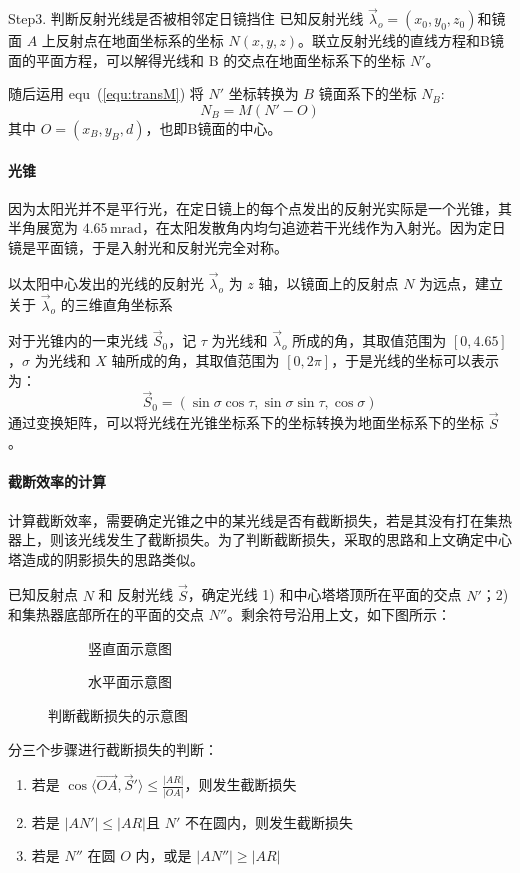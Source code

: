 \documentclass[../main.tex]{subfiles}
\begin{document}

Step3. 判断反射光线是否被相邻定日镜挡住
已知反射光线 \(\vec \lambda _{o} = (x_0,y_0,z_0)\)和镜面 \(A\) 上反射点在地面坐标系的坐标 \(N\)\((x, y, z)\)。联立反射光线的直线方程和B镜面的平面方程，可以解得光线和 B 的交点在地面坐标系下的坐标 \(N'\)。

随后运用 equ~(\ref{equ:transM}) 将 \(N'\) 坐标转换为 \(B\) 镜面系下的坐标 \(N_{B}\):
\[
N_{B} = M (N' - O)
\]
其中 \(O = (x_{B} , y_{B} , d)\)，也即B镜面的中心。

\paragraph{光锥}
因为太阳光并不是平行光，在定日镜上的每个点发出的反射光实际是一个光锥，其半角展宽为 \(4.65 \, \mathrm{m}\mathrm{rad}\)，在太阳发散角内均匀追迹若干光线作为入射光。因为定日镜是平面镜，于是入射光和反射光完全对称。

以太阳中心发出的光线的反射光 \(\vec\lambda _{o} \) 为 \(z\) 轴，以镜面上的反射点 \(N\) 为远点，建立关于 \(\vec \lambda _{o}\) 的三维直角坐标系

对于光锥内的一束光线 \(\vec S _{0}\)，记 \(\tau\) 为光线和 \(\vec\lambda _{o}\) 所成的角，其取值范围为 \([0, 4.65]\)，\(\sigma\) 为光线和 \(X\) 轴所成的角，其取值范围为 \([0 , 2\pi ]\)，于是光线的坐标可以表示为：
\[
\vec S _{0} = (\sin \sigma \cos \tau, \sin \sigma \sin \tau, \cos \sigma)
\]
通过变换矩阵，可以将光线在光锥坐标系下的坐标转换为地面坐标系下的坐标 \(\vec S\)。
\paragraph{截断效率的计算}
计算截断效率，需要确定光锥之中的某光线是否有截断损失，若是其没有打在集热器上，则该光线发生了截断损失。为了判断截断损失，采取的思路和上文确定中心塔造成的阴影损失的思路类似。

已知反射点 \(N\) 和 反射光线 \(\vec S\)，确定光线 1) 和中心塔塔顶所在平面的交点 \(N'\)；2) 和集热器底部所在的平面的交点 \(N''\)。剩余符号沿用上文，如下图所示：

\begin{figure}[H]
\centering
\begin{subfigure}[b]{0.4\textwidth}
\centering

\caption{竖直面示意图}
\end{subfigure}
\begin{subfigure}[b]{0.4\textwidth}
\centering

\caption{水平面示意图}
\end{subfigure}
\caption{判断截断损失的示意图}
\end{figure}

分三个步骤进行截断损失的判断：
\begin{enumerate}
\item 若是 \( \displaystyle\cos \langle \overrightarrow{OA}, \vec S' \rangle\le \frac{\vert AR \vert}{\vert OA \vert}\)，则发生截断损失
\item 若是 \(\vert AN'\vert \le \vert AR \vert\)且 \(N'\) 不在圆内，则发生截断损失
\item 若是 \(N''\) 在圆 \(O\) 内，或是 \(\vert AN'' \vert \ge \vert AR \vert\)
\end{enumerate}
\end{document}
